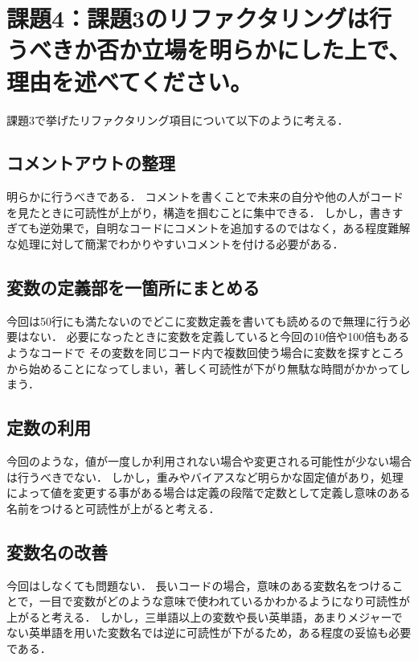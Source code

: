 \documentclass[titlepage]{jarticle}
\begin{document}
\section{課題4：課題3のリファクタリングは行うべきか否か立場を明らかにした上で、理由を述べてください。}
課題3で挙げたリファクタリング項目について以下のように考える．
\subsection{コメントアウトの整理}
明らかに行うべきである．
コメントを書くことで未来の自分や他の人がコードを見たときに可読性が上がり，構造を掴むことに集中できる．
しかし，書きすぎても逆効果で，自明なコードにコメントを追加するのではなく，ある程度難解な処理に対して簡潔でわかりやすいコメントを付ける必要がある．
\subsection{変数の定義部を一箇所にまとめる}
今回は50行にも満たないのでどこに変数定義を書いても読めるので無理に行う必要はない．
必要になったときに変数を定義していると今回の10倍や100倍もあるようなコードで
その変数を同じコード内で複数回使う場合に変数を探すところから始めることになってしまい，著しく可読性が下がり無駄な時間がかかってしまう．
\subsection{定数の利用}
今回のような，値が一度しか利用されない場合や変更される可能性が少ない場合は行うべきでない．
しかし，重みやバイアスなど明らかな固定値があり，処理によって値を変更する事がある場合は定義の段階で定数として定義し意味のある名前をつけると可読性が上がると考える．
\subsection{変数名の改善}
今回はしなくても問題ない．
長いコードの場合，意味のある変数名をつけることで，一目で変数がどのような意味で使われているかわかるようになり可読性が上がると考える．
しかし，三単語以上の変数や長い英単語，あまりメジャーでない英単語を用いた変数名では逆に可読性が下がるため，ある程度の妥協も必要である．
\end{document}
